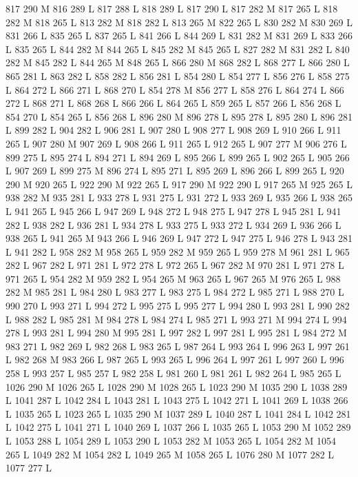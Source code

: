 {{{{{{{{{{{{{{{{{{817 290 M 816 289 L
817 288 L
818 289 L
817 290 L
817 282 M 817 265 L
818 282 M 818 265 L
813 282 M 818 282 L
813 265 M 822 265 L
830 282 M 830 269 L
831 266 L
835 265 L
837 265 L
841 266 L
844 269 L
831 282 M 831 269 L
833 266 L
835 265 L
844 282 M 844 265 L
845 282 M 845 265 L
827 282 M 831 282 L
840 282 M 845 282 L
844 265 M 848 265 L
866 280 M 868 282 L
868 277 L
866 280 L
865 281 L
863 282 L
858 282 L
856 281 L
854 280 L
854 277 L
856 276 L
858 275 L
864 272 L
866 271 L
868 270 L
854 278 M 856 277 L
858 276 L
864 274 L
866 272 L
868 271 L
868 268 L
866 266 L
864 265 L
859 265 L
857 266 L
856 268 L
854 270 L
854 265 L
856 268 L
896 280 M 896 278 L
895 278 L
895 280 L
896 281 L
899 282 L
904 282 L
906 281 L
907 280 L
908 277 L
908 269 L
910 266 L
911 265 L
907 280 M 907 269 L
908 266 L
911 265 L
912 265 L
907 277 M 906 276 L
899 275 L
895 274 L
894 271 L
894 269 L
895 266 L
899 265 L
902 265 L
905 266 L
907 269 L
899 275 M 896 274 L
895 271 L
895 269 L
896 266 L
899 265 L
920 290 M 920 265 L
922 290 M 922 265 L
917 290 M 922 290 L
917 265 M 925 265 L
938 282 M 935 281 L
933 278 L
931 275 L
931 272 L
933 269 L
935 266 L
938 265 L
941 265 L
945 266 L
947 269 L
948 272 L
948 275 L
947 278 L
945 281 L
941 282 L
938 282 L
936 281 L
934 278 L
933 275 L
933 272 L
934 269 L
936 266 L
938 265 L
941 265 M 943 266 L
946 269 L
947 272 L
947 275 L
946 278 L
943 281 L
941 282 L
958 282 M 958 265 L
959 282 M 959 265 L
959 278 M 961 281 L
965 282 L
967 282 L
971 281 L
972 278 L
972 265 L
967 282 M 970 281 L
971 278 L
971 265 L
954 282 M 959 282 L
954 265 M 963 265 L
967 265 M 976 265 L
988 282 M 985 281 L
984 280 L
983 277 L
983 275 L
984 272 L
985 271 L
988 270 L
990 270 L
993 271 L
994 272 L
995 275 L
995 277 L
994 280 L
993 281 L
990 282 L
988 282 L
985 281 M 984 278 L
984 274 L
985 271 L
993 271 M 994 274 L
994 278 L
993 281 L
994 280 M 995 281 L
997 282 L
997 281 L
995 281 L
984 272 M 983 271 L
982 269 L
982 268 L
983 265 L
987 264 L
993 264 L
996 263 L
997 261 L
982 268 M 983 266 L
987 265 L
993 265 L
996 264 L
997 261 L
997 260 L
996 258 L
993 257 L
985 257 L
982 258 L
981 260 L
981 261 L
982 264 L
985 265 L
1026 290 M 1026 265 L
1028 290 M 1028 265 L
1023 290 M 1035 290 L
1038 289 L
1041 287 L
1042 284 L
1043 281 L
1043 275 L
1042 271 L
1041 269 L
1038 266 L
1035 265 L
1023 265 L
1035 290 M 1037 289 L
1040 287 L
1041 284 L
1042 281 L
1042 275 L
1041 271 L
1040 269 L
1037 266 L
1035 265 L
1053 290 M 1052 289 L
1053 288 L
1054 289 L
1053 290 L
1053 282 M 1053 265 L
1054 282 M 1054 265 L
1049 282 M 1054 282 L
1049 265 M 1058 265 L
1076 280 M 1077 282 L
1077 277 L
}}}}}}}}}}}}}}}}}}

